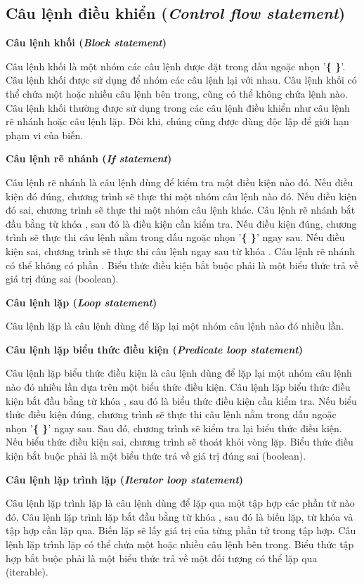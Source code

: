 \subsection{Câu lệnh điều khiển (\textit{Control flow statement})}

\noindent\textbf{Câu lệnh khối (\textit{Block statement})}

\regexblockstmt

Câu lệnh khối là một nhóm các câu lệnh được đặt trong dấu ngoặc nhọn '\textbf{\{ \}}'. Câu lệnh khối được sử dụng để nhóm các câu lệnh lại với nhau. Câu lệnh khối có thể chứa một hoặc nhiều câu lệnh bên trong, cũng có thể không chứa lệnh nào. Câu lệnh khối thường được sử dụng trong các câu lệnh điều khiển như câu lệnh rẽ nhánh hoặc câu lệnh lặp. Đôi khi, chúng cũng được dùng độc lập để giới hạn phạm vi của biến.

\noindent\textbf{Câu lệnh rẽ nhánh (\textit{If statement})}

\regexifstmt

Câu lệnh rẽ nhánh là câu lệnh dùng để kiểm tra một điều kiện nào đó. Nếu điều kiện đó đúng, chương trình sẽ thực thi một nhóm câu lệnh nào đó. Nếu điều kiện đó sai, chương trình sẽ thực thi một nhóm câu lệnh khác. Câu lệnh rẽ nhánh bắt đầu bằng từ khóa , sau đó là điều kiện cần kiểm tra. Nếu điều kiện đúng, chương trình sẽ thực thi câu lệnh nằm trong dấu ngoặc nhọn '\textbf{\{ \}}' ngay sau. Nếu điều kiện sai, chương trình sẽ thực thi câu lệnh ngay sau từ khóa . Câu lệnh rẽ nhánh có thể không có phần . Biểu thức điều kiện bắt buộc phải là một biểu thức trả về giá trị đúng sai (boolean).

\noindent\textbf{Câu lệnh lặp (\textit{Loop statement})}

\regexloopstmt

Câu lệnh lặp là câu lệnh dùng để lặp lại một nhóm câu lệnh nào đó nhiều lần.

\noindent\textbf{Câu lệnh lặp biểu thức điều kiện (\textit{Predicate loop statement})}

\regexpredloopstmt

Câu lệnh lặp biểu thức điều kiện là câu lệnh dùng để lặp lại một nhóm câu lệnh nào đó nhiều lần dựa trên một biểu thức điều kiện. Câu lệnh lặp biểu thức điều kiện bắt đầu bằng từ khóa , sau đó là biểu thức điều kiện cần kiểm tra. Nếu biểu thức điều kiện đúng, chương trình sẽ thực thi câu lệnh nằm trong dấu ngoặc nhọn '\textbf{\{ \}}' ngay sau. Sau đó, chương trình sẽ kiểm tra lại biểu thức điều kiện. Nếu biểu thức điều kiện sai, chương trình sẽ thoát khỏi vòng lặp. Biểu thức điều kiện bắt buộc phải là một biểu thức trả về giá trị đúng sai (boolean).

\noindent\textbf{Câu lệnh lặp trình lặp (\textit{Iterator loop statement})}

\regexiterloopstmt

Câu lệnh lặp trình lặp là câu lệnh dùng để lặp qua một tập hợp các phần tử nào đó. Câu lệnh lặp trình lặp bắt đầu bằng từ khóa , sau đó là biến lặp, từ khóa  và tập hợp cần lặp qua. Biến lặp sẽ lấy giá trị của từng phần tử trong tập hợp. Câu lệnh lặp trình lặp có thể chứa một hoặc nhiều câu lệnh bên trong. Biểu thức tập hợp bắt buộc phải là một biểu thức trả về một đối tượng có thể lặp qua (iterable).

